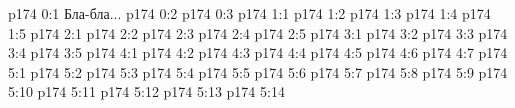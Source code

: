 \author{Промежуточные создания}
\vs p174 0:1  Бла-бла...
\vs p174 0:2 
\vs p174 0:3 
\vs p174 1:1 
\vs p174 1:2 
\vs p174 1:3 
\vs p174 1:4 
\vs p174 1:5 
\vs p174 2:1 
\vs p174 2:2 
\vs p174 2:3 
\vs p174 2:4 
\vs p174 2:5 
\vs p174 3:1 
\vs p174 3:2 
\vs p174 3:3 
\vs p174 3:4 \pc 
\vs p174 3:5 
\vs p174 4:1 
\vs p174 4:2 
\vs p174 4:3 
\vs p174 4:4 \pc 
\vs p174 4:5 \pc 
\vs p174 4:6 
\vs p174 4:7 
\vs p174 5:1 
\vs p174 5:2 
\vs p174 5:3 \pc 
\vs p174 5:4 
\vs p174 5:5 
\vs p174 5:6 
\vs p174 5:7 \pc 
\vs p174 5:8 
\vs p174 5:9 
\vs p174 5:10 
\vs p174 5:11 
\vs p174 5:12 
\vs p174 5:13 
\vs p174 5:14 
\quizlink
